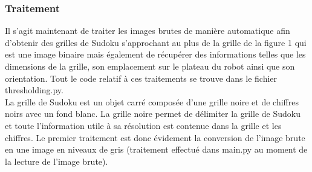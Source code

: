 \documentclass[12pt]{article}
\begin{document}
\subsubsection{ Traitement}

Il s'agit maintenant de traiter les images brutes de manière automatique afin d'obtenir des grilles de Sudoku s'approchant au plus de la grille de la figure 1 qui est une image binaire mais également de récupérer des informations telles que les dimensions de la grille, son emplacement sur le plateau du robot ainsi que son orientation. Tout le code relatif à ces traitements se trouve dans le fichier thresholding.py.\\

\noindent
La grille de Sudoku est un objet carré composée d'une grille noire et de chiffres noirs avec un fond blanc. La grille noire permet de délimiter la grille de Sudoku et toute l'information utile à sa résolution est contenue dans la grille et les chiffres. Le premier traitement est donc évidement la conversion de l'image brute en une image en niveaux de gris (traitement effectué dans main.py au moment de la lecture de l'image brute).\\
\end{document}
